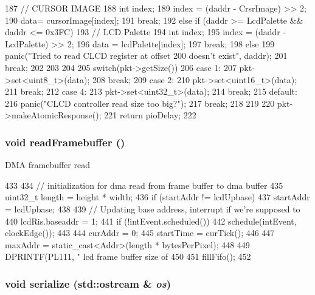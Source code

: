 \begin{DoxyCode}
{{{187             // CURSOR IMAGE
188             int index;
189             index = (daddr - CrsrImage) >> 2;
190             data= cursorImage[index];
191             break;
192         } else if (daddr >= LcdPalette && daddr <= 0x3FC) {
193             // LCD Palette
194             int index;
195             index = (daddr - LcdPalette) >> 2;
196             data = lcdPalette[index];
197             break;
198         } else {
199             panic("Tried to read CLCD register at offset %
200                        doesn't exist\n", daddr);
201             break;
202         }
203     }
204 
205     switch(pkt->getSize()) {
206       case 1:
207         pkt->set<uint8_t>(data);
208         break;
209       case 2:
210         pkt->set<uint16_t>(data);
211         break;
212       case 4:
213         pkt->set<uint32_t>(data);
214         break;
215       default:
216         panic("CLCD controller read size too big?\n");
217         break;
218     }
219 
220     pkt->makeAtomicResponse();
221     return pioDelay;
222 }
\end{DoxyCode}
\hypertarget{classPl111_a104de82eb7e1fbd4c9180640f507a5f4}{
\subsubsection[{readFramebuffer}]{\setlength{\rightskip}{0pt plus 5cm}void readFramebuffer ()}}
\label{classPl111_a104de82eb7e1fbd4c9180640f507a5f4}
DMA framebuffer read 


\begin{DoxyCode}
433 {
434     // initialization for dma read from frame buffer to dma buffer
435     uint32_t length = height * width;
436     if (startAddr != lcdUpbase)
437         startAddr = lcdUpbase;
438 
439     // Updating base address, interrupt if we're supposed to
440     lcdRis.baseaddr = 1;
441     if (!intEvent.scheduled())
442         schedule(intEvent, clockEdge());
443 
444     curAddr = 0;
445     startTime = curTick();
446 
447     maxAddr = static_cast<Addr>(length * bytesPerPixel);
448 
449     DPRINTF(PL111, " lcd frame buffer size of %
450 
451     fillFifo();
452 }
\end{DoxyCode}
\hypertarget{classPl111_a53e036786d17361be4c7320d39c99b84}{
\subsubsection[{serialize}]{\setlength{\rightskip}{0pt plus 5cm}void serialize (std::ostream \& {\em os})}}
\label{classPl111_a53e036786d17361be4c7320d39c99b84}


